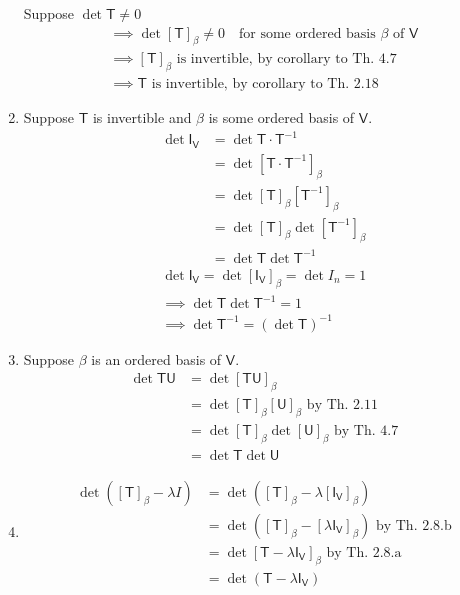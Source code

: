 \begin{enumerate}
Suppose $\det{\mathsf{T}}\neq 0$ 
\begin{gather}
\implies \det[\mathsf{T}]_\beta \neq 0 \quad \text{for some ordered
  basis } \beta \text{ of } \mathsf{V}\\
\implies [\mathsf{T}]_\beta \text{ is invertible, by corollary to Th. 4.7}\\ 
\implies \mathsf{T} \text{ is invertible, by corollary to Th. 2.18}
\end{gather}
\item Suppose $\mathsf{T}$ is invertible and $\beta$ is some ordered
  basis of $\mathsf{V}$.
\begin{align}
\det{\mathsf{I}_\mathsf{V}} &= \det{\mathsf{T}\cdot\mathsf{T}^{-1}}\\
&= \det{[\mathsf{T}\cdot\mathsf{T}^{-1}]_\beta}\\
&= \det{[\mathsf{T}]_\beta[\mathsf{T}^{-1}]_\beta}\\
&= \det{[\mathsf{T}]_\beta}\det{[\mathsf{T}^{-1}]_\beta}\\
&= \det{\mathsf{T}}\det{\mathsf{T}^{-1}}
\end{align}
\begin{gather}
\det{\mathsf{I}_\mathsf{V}} = \det{[\mathsf{I}_\mathsf{V}]_\beta} =
  \det{I_n} =1\\
\implies \det{\mathsf{T}} \det{\mathsf{T}^{-1}} = 1\\
\implies \det{\mathsf{T}^{-1}} = (\det{\mathsf{T}})^{-1}
\end{gather}
\item Suppose $\beta$ is an ordered basis of $\mathsf{V}$.
\begin{align}
\det{\mathsf{TU}} &= \det{[\mathsf{TU}]_\beta}\\
&= \det{[\mathsf{T}]_\beta[\mathsf{U}]_\beta} \text{ by Th. 2.11}\\
&= \det{[\mathsf{T}]_\beta}\det{[\mathsf{U}]_\beta} \text{ by Th. 4.7}\\
&= \det{\mathsf{T}}\det{\mathsf{U}}
\end{align}
\item 
\begin{align}
\det{([\mathsf{T}]_\beta -\lambda I)} &= \det{([\mathsf{T}]_\beta
  -\lambda[\mathsf{I}_\mathsf{V}]_\beta)}\\
&= \det{([\mathsf{T}]_\beta
  -[\lambda\mathsf{I}_\mathsf{V}]_\beta)} \text{ by Th. 2.8.b}\\
&= \det{[\mathsf{T}-\lambda \mathsf{I}_\mathsf{V}]_\beta} \text{ by
  Th. 2.8.a}\\
&= \det{(\mathsf{T}-\lambda \mathsf{I}_\mathsf{V})}
\end{align}
\end{enumerate}
